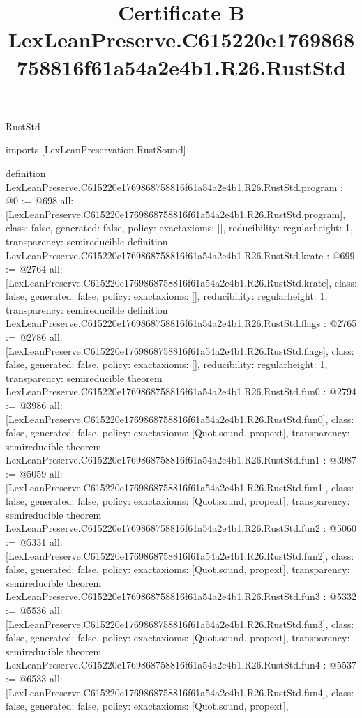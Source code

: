 \begin{lexlean}{RustStd}
\title{Certificate B LexLeanPreserve.C615220e1769868758816f61a54a2e4b1.R26.RustStd}
\begin{coremodule}
imports [LexLeanPreservation.RustSound]

definition LexLeanPreserve.C615220e1769868758816f61a54a2e4b1.R26.RustStd.program : @0 := @698 {
  all: [LexLeanPreserve.C615220e1769868758816f61a54a2e4b1.R26.RustStd.program],
  class: false,
  generated: false,
  policy: exact{axioms: []},
  reducibility: regular{height: 1},
  transparency: semireducible
}
definition LexLeanPreserve.C615220e1769868758816f61a54a2e4b1.R26.RustStd.krate : @699 := @2764 {
  all: [LexLeanPreserve.C615220e1769868758816f61a54a2e4b1.R26.RustStd.krate],
  class: false,
  generated: false,
  policy: exact{axioms: []},
  reducibility: regular{height: 1},
  transparency: semireducible
}
definition LexLeanPreserve.C615220e1769868758816f61a54a2e4b1.R26.RustStd.flags : @2765 := @2786 {
  all: [LexLeanPreserve.C615220e1769868758816f61a54a2e4b1.R26.RustStd.flags],
  class: false,
  generated: false,
  policy: exact{axioms: []},
  reducibility: regular{height: 1},
  transparency: semireducible
}
theorem LexLeanPreserve.C615220e1769868758816f61a54a2e4b1.R26.RustStd.fun0 : @2794 := @3986 {
  all: [LexLeanPreserve.C615220e1769868758816f61a54a2e4b1.R26.RustStd.fun0],
  class: false,
  generated: false,
  policy: exact{axioms: [Quot.sound, propext]},
  transparency: semireducible
}
theorem LexLeanPreserve.C615220e1769868758816f61a54a2e4b1.R26.RustStd.fun1 : @3987 := @5059 {
  all: [LexLeanPreserve.C615220e1769868758816f61a54a2e4b1.R26.RustStd.fun1],
  class: false,
  generated: false,
  policy: exact{axioms: [Quot.sound, propext]},
  transparency: semireducible
}
theorem LexLeanPreserve.C615220e1769868758816f61a54a2e4b1.R26.RustStd.fun2 : @5060 := @5331 {
  all: [LexLeanPreserve.C615220e1769868758816f61a54a2e4b1.R26.RustStd.fun2],
  class: false,
  generated: false,
  policy: exact{axioms: [Quot.sound, propext]},
  transparency: semireducible
}
theorem LexLeanPreserve.C615220e1769868758816f61a54a2e4b1.R26.RustStd.fun3 : @5332 := @5536 {
  all: [LexLeanPreserve.C615220e1769868758816f61a54a2e4b1.R26.RustStd.fun3],
  class: false,
  generated: false,
  policy: exact{axioms: [Quot.sound, propext]},
  transparency: semireducible
}
theorem LexLeanPreserve.C615220e1769868758816f61a54a2e4b1.R26.RustStd.fun4 : @5537 := @6533 {
  all: [LexLeanPreserve.C615220e1769868758816f61a54a2e4b1.R26.RustStd.fun4],
  class: false,
  generated: false,
  policy: exact{axioms: [Quot.sound, propext]},
}
\end{coremodule}
\end{lexlean}
